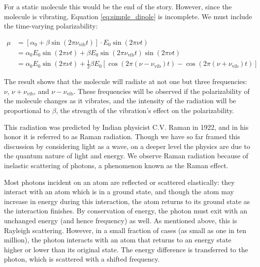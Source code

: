 For a static molecule this would be the end of the story. However, since the molecule is vibrating, Equation \ref{eq:simple_dipole} is incomplete. We must include the time-varying polarizability:

\begin{align}
\mu &= \left[\alpha_0 + \beta\sin(2\pi\nu_\mathrm{vib} t)\right] \cdot E_0\sin(2\pi\nu t)\\
&= \alpha_0E_0\sin(2\pi\nu t) + \beta E_0\sin(2\pi\nu_\mathrm{vib}t)\sin(2\pi\nu t)\\
&= \alpha_0E_0\sin(2\pi\nu t) + \frac{1}{2}\beta E_0\left[\cos(2\pi(\nu - \nu_\mathrm{vib})t) - \cos(2\pi(\nu + \nu_\mathrm{vib})t)\right]
\end{align}

The result shows that the molecule will radiate at not one but three frequencies: $\nu$, $\nu + \nu_\mathrm{vib}$, and  $\nu - \nu_\mathrm{vib}$. These frequencies will be observed if the polarizability of the molecule changes as it vibrates, and the intensity of the radiation will be proportional to $\beta$, the strength of the vibration's effect on the polarizability\cite{RefWorks:31}.

This radiation was predicted by Indian physicist C.V. Raman in 1922, and in his honor it is referred to as Raman radiation. Though we have so far framed this discussion by considering light as a wave, on a deeper level the physics are due to the quantum nature of light and energy. We observe Raman radiation because of inelastic scattering of photons, a phenomenon known as the Raman effect.

Most photons incident on an atom are reflected or scattered elastically: they interact with an atom which is in a ground state, and though the atom may increase in energy during this interaction, the atom returns to its ground state as the interaction finishes. By conservation of energy, the photon must exit with an unchanged energy (and hence frequency) as well. As mentioned above, this is Rayleigh scattering. However, in a small fraction of cases (as small as one in ten million), the photon interacts with an atom that returns to an energy state higher or lower than its original state. The energy difference is transferred to the photon, which is scattered with a shifted frequency.

